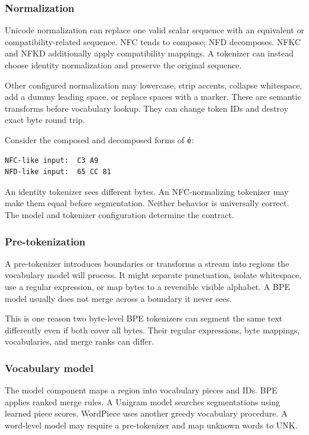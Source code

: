 \documentclass[
  10pt,
]{article}
\begin{document}
\subsubsection{Normalization}\label{normalization}

Unicode normalization can replace one valid scalar sequence with an
equivalent or compatibility-related sequence. NFC tends to compose; NFD
decomposes. NFKC and NFKD additionally apply compatibility mappings. A
tokenizer can instead choose identity normalization and preserve the
original sequence.

Other configured normalization may lowercase, strip accents, collapse
whitespace, add a dummy leading space, or replace spaces with a marker.
These are semantic transforms before vocabulary lookup. They can change
token IDs and destroy exact byte round trip.

Consider the composed and decomposed forms of \texttt{é}:

\begin{verbatim}
NFC-like input:  C3 A9
NFD-like input:  65 CC 81
\end{verbatim}

An identity tokenizer sees different bytes. An NFC-normalizing tokenizer
may make them equal before segmentation. Neither behavior is universally
correct. The model and tokenizer configuration determine the contract.

\subsubsection{Pre-tokenization}\label{pre-tokenization}

A pre-tokenizer introduces boundaries or transforms a stream into
regions the vocabulary model will process. It might separate
punctuation, isolate whitespace, use a regular expression, or map bytes
to a reversible visible alphabet. A BPE model usually does not merge
across a boundary it never sees.

This is one reason two byte-level BPE tokenizers can segment the same
text differently even if both cover all bytes. Their regular
expressions, byte mappings, vocabularies, and merge ranks can differ.

\subsubsection{Vocabulary model}\label{vocabulary-model}

The model component maps a region into vocabulary pieces and IDs. BPE
applies ranked merge rules. A Unigram model searches segmentations using
learned piece scores. WordPiece uses another greedy vocabulary
procedure. A word-level model may require a pre-tokenizer and map
unknown words to UNK.
\end{document}
